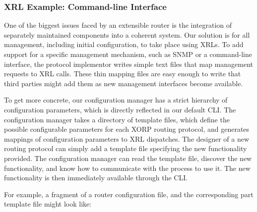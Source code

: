 \subsubsection{XRL Example: Command-line Interface}

One of the biggest issues faced by an {extensible} router is 
the integration of separately maintained components into a coherent
system.  
Our solution is for all management, including initial configuration, to
take place using XRLs.  To add support for a specific management
mechanism, such as SNMP or a command-line interface, the protocol
implementor writes simple text files that map management requests to
XRL calls.  These thin mapping files are easy enough to write that
third parties might add them as new management interfaces become
available.

To get more concrete, our configuration manager has a strict hierarchy
of configuration parameters, which is directly reflected in our
default CLI.  The configuration manager takes a directory of template
files, which define the possible configurable parameters for each XORP
routing protocol, and generates mappings of configuration parameters
to XRL dispatches.  The designer of a new routing protocol can simply
add a template file specifying the new functionality provided.  The
configuration manager can read the template file, discover the new
functionality, and know how to communicate with the process to use it.
The new functionality is then immediately available through the CLI.

For example, a fragment of a router configuration file, and the
corresponding part template file might look like:
\vspace{-0.1in}

